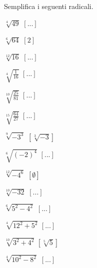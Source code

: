 
\begin{esercizio}[\Ast]
 \label{ese:2.24}
Semplifica i seguenti radicali.
 \begin{multicols}{3}
 \begin{enumeratea}
 \item $\sqrt[4]{49}$
  \hfill $\left[...\right]$
 \item $\sqrt[6]{64}$
  \hfill $\left[2\right]$
 \item $\sqrt[12]{16}$
  \hfill $\left[...\right]$
 \item $\sqrt[4]{\frac 1{16}}$
  \hfill $\left[...\right]$
 \item $\sqrt[10]{\frac{25}{81}}$
  \hfill $\left[...\right]$
 \item $\sqrt[15]{\frac{64}{27}}$
  \hfill $\left[...\right]$
 \item $\sqrt[9]{-3^3}$
  \hfill $\left[\sqrt[3]{-3}\right]$
 \item $\sqrt[6]{(-2)^4}$
  \hfill $\left[...\right]$
 \item $\sqrt[12]{-4^6}$
  \hfill $\left[\emptyset\right]$
 \item $\sqrt[10]{-32}$
  \hfill $\left[...\right]$
 \item $\sqrt[6]{5^2-4^2}$
  \hfill $\left[...\right]$
 \item $\sqrt[4]{12^2+5^2}$
  \hfill $\left[...\right]$
 \item $\sqrt[10]{3^2+4^2}$
  \hfill $\left[\sqrt[5]5\right]$
 \item $\sqrt[4]{10^2-8^2}$
  \hfill $\left[...\right]$

\end{enumeratea}
\end{multicols}
\end{esercizio}
